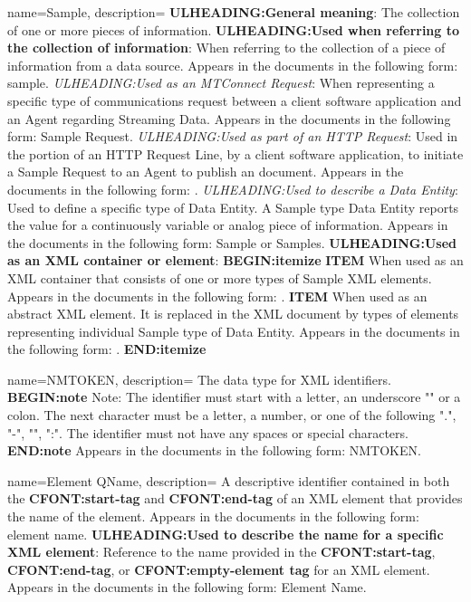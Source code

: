 {
    name={Sample},
	description={
	\textbf{ULHEADING:General meaning}:
	The collection of one or more pieces of information.  
	\textbf{ULHEADING:Used when referring to the collection of information}:
	When referring to the collection of a piece of information from a data source.
	Appears in the documents in the following form: sample.
	\textit{ULHEADING:Used as an \gls{MTConnect Request}}:
	When representing a specific type of communications request between a client software application and an \gls{Agent} regarding \gls{Streaming Data}.  
	Appears in the documents in the following form: \gls{Sample Request}.
	\textit{ULHEADING:Used as part of an \gls{HTTP Request}}:
	Used in the  portion of an \gls{HTTP Request Line}, by a client software application, to initiate a \gls{Sample Request} to an \gls{Agent} to publish an  document.
	Appears in the documents in the following form: .
	\textit{ULHEADING:Used to describe a \gls{Data Entity}}:
	Used to define a specific type of \gls{Data Entity}.  A \gls{Sample} type \gls{Data Entity} reports the value for a continuously variable or analog piece of information.
	Appears in the documents in the following form: \gls{Sample} or \gls{Samples}.
	\textbf{ULHEADING:Used as an XML container or element}:
    \textbf{BEGIN:itemize}
	\textbf{ITEM} When used as an XML container that consists of one or more types of Sample XML elements.
	Appears in the documents in the following form: .
	\textbf{ITEM} When used as an abstract XML element.  It is replaced in the XML document by types of  elements representing individual \gls{Sample} type of \gls{Data Entity}.
	Appears in the documents in the following form: .
    \textbf{END:itemize}
}
}

{
    name={NMTOKEN},
	description={
	The data type for XML identifiers.
	\textbf{BEGIN:note}
	Note: The identifier must start with a letter, an underscore "\textunderscore " or a colon.  The next character must be a letter, a number, or one of the following ".", "-", "\textunderscore ", ":".  The identifier must not have any spaces or special characters.
	\textbf{END:note}
	Appears in the documents in the following form: \gls{NMTOKEN}.
}
}

{
    name={Element QName},
	description={
	A descriptive identifier contained in both the \textbf{CFONT:start-tag} and \textbf{CFONT:end-tag} of an XML element that provides the name of the element.
	Appears in the documents in the following form: element name.
	\textbf{ULHEADING:Used to describe the name for a specific XML element}:
	Reference to the name provided in the \textbf{CFONT:start-tag}, \textbf{CFONT:end-tag}, or \textbf{CFONT:empty-element tag} for an XML element.
	Appears in the documents in the following form: \gls{Element Name}.
}
}

